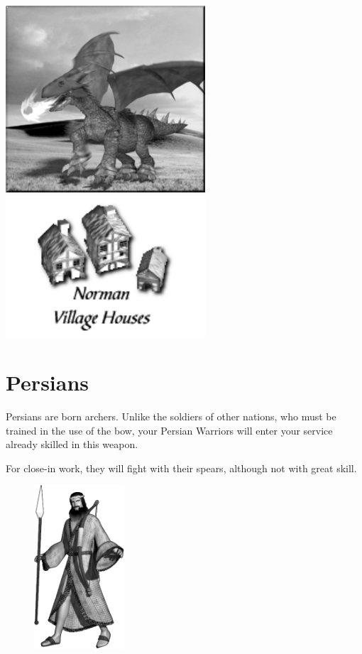 \begin{center}
	\includegraphics[width=74.25mm]{Adragon}\includegraphics[width=74.25mm]{Inormanhouse}
\end{center}

\clearpage

\section{Persians}

Persians are born archers. Unlike the soldiers of other nations, who must be trained in the use of the bow, your Persian Warriors will enter your service already skilled in this weapon.

For close-in work, they will fight with their spears, although not with great skill.

\begin{figure}
	\begin{center}
		\vspace{-20pt}
		\includegraphics[width=0.3\textwidth]{Apersian}
	\end{center}
	\vspace{-20pt}
\end{figure}

